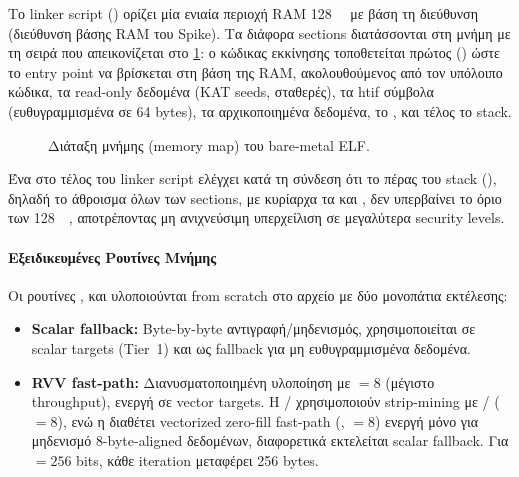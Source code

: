 Το linker script () ορίζει μία ενιαία περιοχή RAM \SI{128}{\mebi\byte}
με βάση τη διεύθυνση  (διεύθυνση βάσης RAM του Spike). 
Τα διάφορα sections διατάσσονται στη μνήμη με τη σειρά που απεικονίζεται στο
\cref{fig:memory-map}: ο κώδικας εκκίνησης τοποθετείται πρώτος
() ώστε το entry point να βρίσκεται στη βάση της RAM,
ακολουθούμενος από τον υπόλοιπο κώδικα, τα read-only δεδομένα (KAT seeds,
σταθερές), τα \gls{htif} σύμβολα (ευθυγραμμισμένα σε \num{64} bytes), τα
αρχικοποιημένα δεδομένα, το , και τέλος το stack.

\begin{figure}[htbp]
  \centering
  
  \caption{Διάταξη μνήμης (memory map) του bare-metal ELF.}
  \label{fig:memory-map}
\end{figure}

\noindent
Ένα  στο τέλος του linker script ελέγχει κατά τη σύνδεση ότι
το πέρας του stack (), δηλαδή το άθροισμα όλων των sections,
με κυρίαρχα τα  και , δεν υπερβαίνει το όριο των
\SI{128}{\mebi\byte}, αποτρέποντας μη ανιχνεύσιμη υπερχείλιση σε μεγαλύτερα security levels.

\paragraph{Εξειδικευμένες Ρουτίνες Μνήμης}

Οι ρουτίνες ,  και  υλοποιούνται 
from scratch στο αρχείο  με δύο μονοπάτια εκτέλεσης:

\begin{itemize}
  \item \textbf{Scalar fallback:} Byte-by-byte αντιγραφή/μηδενισμός, χρησιμοποιείται
    σε scalar targets (Tier~1) και ως fallback για μη ευθυγραμμισμένα δεδομένα.
  \item \textbf{RVV fast-path:} Διανυσματοποιημένη υλοποίηση με \LMUL $= 8$
    (μέγιστο throughput), ενεργή σε vector targets. Η /
    χρησιμοποιούν strip-mining με / (\SEW $= 8$), ενώ η
     διαθέτει vectorized zero-fill fast-path (,
    \LMUL $= 8$) ενεργή μόνο για μηδενισμό 8-byte-aligned δεδομένων, διαφορετικά
    εκτελείται scalar fallback. Για \VLEN $= \num{256}$ bits, κάθε iteration
    μεταφέρει \num{256} bytes.
\end{itemize}

